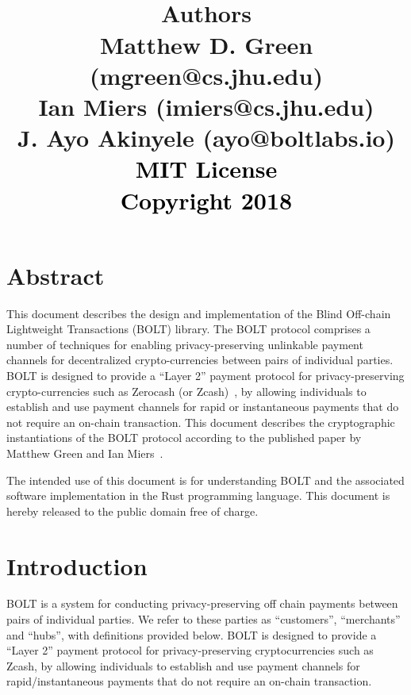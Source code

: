 \documentclass[11pt]{report}
\title{%
\vspace{-1in}
\center
\vspace{1in}
\center
\textcolor{black}{
  {\selectfont{\huge{Blind Off-Chain\\Lightweight Transactions\\(BOLT)}}}}
  \center
  \textcolor{black}{
  {\selectfont{\huge{Version \myversion}}}}
\vspace{1in}
\\
{{\bf Authors}\\ Matthew D. Green (mgreen@cs.jhu.edu) \\ Ian Miers (imiers@cs.jhu.edu)\\J. Ayo Akinyele (ayo@boltlabs.io)}
\\
\vspace{2in}
  \textcolor{black}{
  {{\small{MIT License\\Copyright {\textcopyright} 2018}}}}
}
\date{}
\begin{document}
\maketitle
\tableofcontents
\thispagestyle{myfancypage}

\newpage
\chapter*{Abstract}
\label{ch:abstract}
\thispagestyle{myfancypage}

This document describes the design and implementation of the Blind Off-chain Lightweight Transactions (BOLT) library. The BOLT protocol comprises a number of techniques for enabling privacy-preserving unlinkable payment channels for decentralized crypto-currencies between pairs of individual parties. BOLT is designed to provide a ``Layer 2'' payment protocol for privacy-preserving crypto-currencies such as Zerocash (or Zcash)~\cite{Zerocash}, by allowing individuals to establish and use payment channels for rapid or instantaneous payments that do not require an on-chain transaction. This document describes the cryptographic instantiations of the BOLT protocol according to the published paper by Matthew Green and Ian Miers~\cite{BoltCCS}.

The intended use of this document is for understanding BOLT and the associated software implementation in the Rust programming language.  
This document is hereby released to the public domain free of charge.

\thispagestyle{myfancypage}
\chapter{Introduction}
\label{sec:introduction}
\thispagestyle{myfancypage}

BOLT is a system for conducting privacy-preserving off chain payments between pairs of individual parties. We refer to these parties as ``customers'', ``merchants'' and ``hubs'', with definitions provided below. BOLT is designed to provide a ``Layer 2'' payment protocol for privacy-preserving cryptocurrencies such as Zcash, by allowing individuals to establish and use payment channels for rapid/instantaneous payments that do not require an on-chain transaction.
\end{document}
